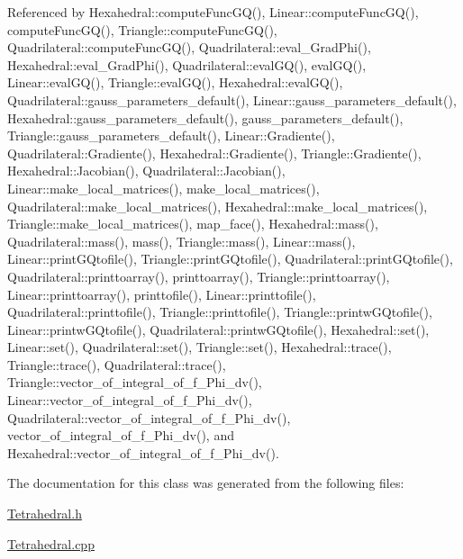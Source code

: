 Referenced by Hexahedral\+::compute\+Func\+G\+Q(), Linear\+::compute\+Func\+G\+Q(), compute\+Func\+G\+Q(), Triangle\+::compute\+Func\+G\+Q(), Quadrilateral\+::compute\+Func\+G\+Q(), Quadrilateral\+::eval\+\_\+\+Grad\+Phi(), Hexahedral\+::eval\+\_\+\+Grad\+Phi(), Quadrilateral\+::eval\+G\+Q(), eval\+G\+Q(), Linear\+::eval\+G\+Q(), Triangle\+::eval\+G\+Q(), Hexahedral\+::eval\+G\+Q(), Quadrilateral\+::gauss\+\_\+parameters\+\_\+default(), Linear\+::gauss\+\_\+parameters\+\_\+default(), Hexahedral\+::gauss\+\_\+parameters\+\_\+default(), gauss\+\_\+parameters\+\_\+default(), Triangle\+::gauss\+\_\+parameters\+\_\+default(), Linear\+::\+Gradiente(), Quadrilateral\+::\+Gradiente(), Hexahedral\+::\+Gradiente(), Triangle\+::\+Gradiente(), Hexahedral\+::\+Jacobian(), Quadrilateral\+::\+Jacobian(), Linear\+::make\+\_\+local\+\_\+matrices(), make\+\_\+local\+\_\+matrices(), Quadrilateral\+::make\+\_\+local\+\_\+matrices(), Hexahedral\+::make\+\_\+local\+\_\+matrices(), Triangle\+::make\+\_\+local\+\_\+matrices(), map\+\_\+face(), Hexahedral\+::mass(), Quadrilateral\+::mass(), mass(), Triangle\+::mass(), Linear\+::mass(), Linear\+::print\+G\+Qtofile(), Triangle\+::print\+G\+Qtofile(), Quadrilateral\+::print\+G\+Qtofile(), Quadrilateral\+::printtoarray(), printtoarray(), Triangle\+::printtoarray(), Linear\+::printtoarray(), printtofile(), Linear\+::printtofile(), Quadrilateral\+::printtofile(), Triangle\+::printtofile(), Triangle\+::printw\+G\+Qtofile(), Linear\+::printw\+G\+Qtofile(), Quadrilateral\+::printw\+G\+Qtofile(), Hexahedral\+::set(), Linear\+::set(), Quadrilateral\+::set(), Triangle\+::set(), Hexahedral\+::trace(), Triangle\+::trace(), Quadrilateral\+::trace(), Triangle\+::vector\+\_\+of\+\_\+integral\+\_\+of\+\_\+f\+\_\+\+Phi\+\_\+dv(), Linear\+::vector\+\_\+of\+\_\+integral\+\_\+of\+\_\+f\+\_\+\+Phi\+\_\+dv(), Quadrilateral\+::vector\+\_\+of\+\_\+integral\+\_\+of\+\_\+f\+\_\+\+Phi\+\_\+dv(), vector\+\_\+of\+\_\+integral\+\_\+of\+\_\+f\+\_\+\+Phi\+\_\+dv(), and Hexahedral\+::vector\+\_\+of\+\_\+integral\+\_\+of\+\_\+f\+\_\+\+Phi\+\_\+dv().



The documentation for this class was generated from the following files\+:\begin{DoxyCompactItemize}
\item 
\hyperlink{Tetrahedral_8h}{Tetrahedral.\+h}\item 
\hyperlink{Tetrahedral_8cpp}{Tetrahedral.\+cpp}\end{DoxyCompactItemize}

